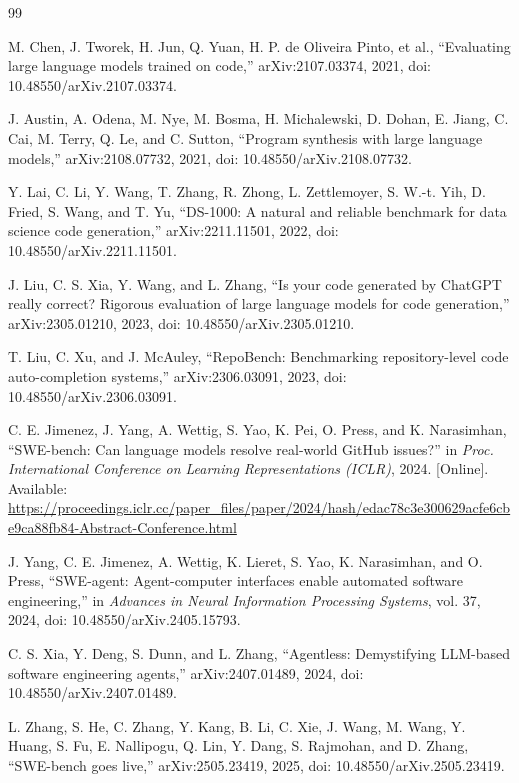 \documentclass[preprint,12pt]{elsarticle}
\begin{document}
\begin{thebibliography}{99}

 M. Chen, J. Tworek, H. Jun, Q. Yuan, H. P. de Oliveira Pinto, et al., ``Evaluating large language models trained on code,'' arXiv:2107.03374, 2021, doi: 10.48550/arXiv.2107.03374.

 J. Austin, A. Odena, M. Nye, M. Bosma, H. Michalewski, D. Dohan, E. Jiang, C. Cai, M. Terry, Q. Le, and C. Sutton, ``Program synthesis with large language models,'' arXiv:2108.07732, 2021, doi: 10.48550/arXiv.2108.07732.

 Y. Lai, C. Li, Y. Wang, T. Zhang, R. Zhong, L. Zettlemoyer, S. W.-t. Yih, D. Fried, S. Wang, and T. Yu, ``DS-1000: A natural and reliable benchmark for data science code generation,'' arXiv:2211.11501, 2022, doi: 10.48550/arXiv.2211.11501.

 J. Liu, C. S. Xia, Y. Wang, and L. Zhang, ``Is your code generated by ChatGPT really correct? Rigorous evaluation of large language models for code generation,'' arXiv:2305.01210, 2023, doi: 10.48550/arXiv.2305.01210.

 T. Liu, C. Xu, and J. McAuley, ``RepoBench: Benchmarking repository-level code auto-completion systems,'' arXiv:2306.03091, 2023, doi: 10.48550/arXiv.2306.03091.

 C. E. Jimenez, J. Yang, A. Wettig, S. Yao, K. Pei, O. Press, and K. Narasimhan, ``SWE-bench: Can language models resolve real-world GitHub issues?'' in \textit{Proc. International Conference on Learning Representations (ICLR)}, 2024. [Online]. Available: \url{https://proceedings.iclr.cc/paper_files/paper/2024/hash/edac78c3e300629acfe6cbe9ca88fb84-Abstract-Conference.html}

 J. Yang, C. E. Jimenez, A. Wettig, K. Lieret, S. Yao, K. Narasimhan, and O. Press, ``SWE-agent: Agent-computer interfaces enable automated software engineering,'' in \textit{Advances in Neural Information Processing Systems}, vol. 37, 2024, doi: 10.48550/arXiv.2405.15793.

 C. S. Xia, Y. Deng, S. Dunn, and L. Zhang, ``Agentless: Demystifying LLM-based software engineering agents,'' arXiv:2407.01489, 2024, doi: 10.48550/arXiv.2407.01489.

 L. Zhang, S. He, C. Zhang, Y. Kang, B. Li, C. Xie, J. Wang, M. Wang, Y. Huang, S. Fu, E. Nallipogu, Q. Lin, Y. Dang, S. Rajmohan, and D. Zhang, ``SWE-bench goes live,'' arXiv:2505.23419, 2025, doi: 10.48550/arXiv.2505.23419.


\end{thebibliography}
\end{document}

